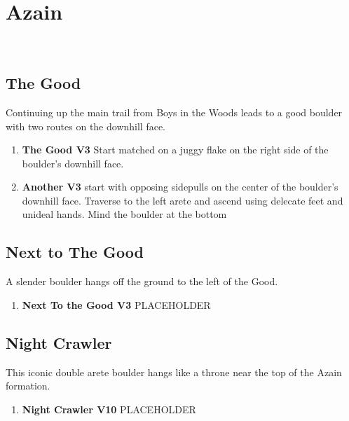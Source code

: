 \section{Azain}\label{sa:Azain}
\
\subsection*{The Good}\label{bf:The Good}
Continuing up the main trail from Boys in the Woods leads to a good boulder with two routes on the downhill face.

\begin{enumerate}[]
	\item\label{rt:The Good} \colorbox{green!20}{\textbf{The Good V3    } }
	\newline Start matched on a juggy flake on the right side of the boulder's downhill face.\
	\item\label{rt:Another} \colorbox{green!20}{\textbf{Another V3   \warn } }
	\newline start with opposing sidepulls on the center of the boulder's downhill face. Traverse to the left arete and ascend using delecate feet and unideal hands. Mind the boulder at the bottom\
\end{enumerate}
\subsection*{Next to The Good}\label{bf:Next to The Good}
A slender boulder hangs off the ground to the left of the Good.

\begin{enumerate}[resume]
	\item\label{rt:Next To the Good} \colorbox{green!20}{\textbf{Next To the Good V3  \warn } }
	\newline PLACEHOLDER\
\end{enumerate}
\subsection*{Night Crawler}\label{bf:Night Crawler}
This iconic double arete boulder hangs like a throne near the top of the Azain formation.

\begin{enumerate}[resume]
	\item\label{rt:Night Crawler} \colorbox{red!20}{\textbf{Night Crawler V10  } }
	\newline PLACEHOLDER\
\end{enumerate}

